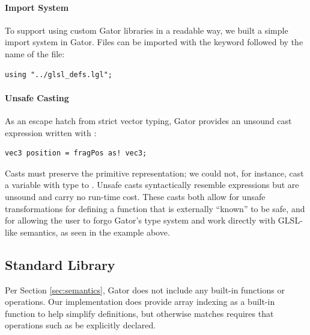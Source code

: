 \documentclass[../main.tex]{subfiles}
\begin{document}
{\paragraph{Import System}
To support using custom Gator libraries in a readable way, we built a simple import system in Gator.  Files can be imported with the keyword  followed by the name of the file:
%
\begin{lstlisting}
using "../glsl_defs.lgl";
\end{lstlisting}
%
\paragraph{Unsafe Casting}
As an escape hatch from strict vector typing, Gator provides an unsound cast expression written with :
%
\begin{lstlisting}
vec3 position = fragPos as! vec3;
\end{lstlisting}
%
Casts must preserve the primitive representation; we could not, for instance, cast a variable with type  to .
Unsafe casts syntactically resemble  expressions but are unsound and carry no run-time cost.
These casts both allow for unsafe transformations for defining a function that is externally ``known'' to be safe, and for allowing the user to forgo Gator's type system and work directly with GLSL-like semantics, as seen in the example above.

\subsection{Standard Library}
Per Section \ref{sec:semantics}, Gator does not include any built-in functions or operations.  Our implementation does provide array indexing as a built-in function to help simplify definitions, but otherwise matches requires that operations such as \code{+} be explicitly declared.

}
\end{document}
